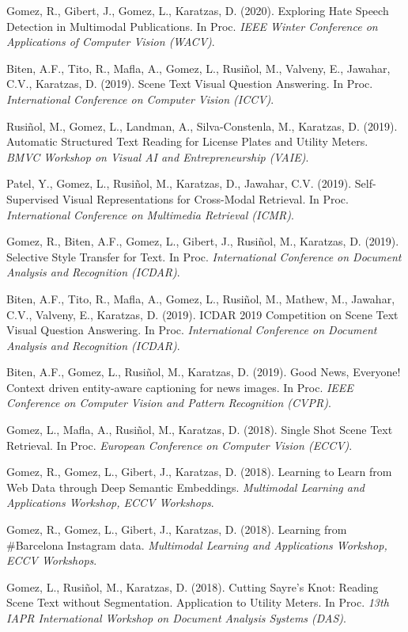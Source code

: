 \documentclass[11pt]{article}
\newcommand{\venue}[1]{\textit{#1}}
\begin{document}
\begin{pubs}
\item Gomez, R., Gibert, J., Gomez, L., Karatzas, D. (2020). Exploring Hate Speech Detection in Multimodal Publications. In Proc. \venue{IEEE Winter Conference on Applications of Computer Vision (WACV)}.
\item Biten, A.F., Tito, R., Mafla, A., Gomez, L., Rusiñol, M., Valveny, E., Jawahar, C.V., Karatzas, D. (2019). Scene Text Visual Question Answering. In Proc. \venue{International Conference on Computer Vision (ICCV)}.
\item Rusiñol, M., Gomez, L., Landman, A., Silva-Constenla, M., Karatzas, D. (2019). Automatic Structured Text Reading for License Plates and Utility Meters. \venue{BMVC Workshop on Visual AI and Entrepreneurship (VAIE)}.
\item Patel, Y., Gomez, L., Rusiñol, M., Karatzas, D., Jawahar, C.V. (2019). Self-Supervised Visual Representations for Cross-Modal Retrieval. In Proc. \venue{International Conference on Multimedia Retrieval (ICMR)}.
\item Gomez, R., Biten, A.F., Gomez, L., Gibert, J., Rusiñol, M., Karatzas, D. (2019). Selective Style Transfer for Text. In Proc. \venue{International Conference on Document Analysis and Recognition (ICDAR)}.
\item Biten, A.F., Tito, R., Mafla, A., Gomez, L., Rusiñol, M., Mathew, M., Jawahar, C.V., Valveny, E., Karatzas, D. (2019). ICDAR 2019 Competition on Scene Text Visual Question Answering. In Proc. \venue{International Conference on Document Analysis and Recognition (ICDAR)}.
\item Biten, A.F., Gomez, L., Rusiñol, M., Karatzas, D. (2019). Good News, Everyone! Context driven entity-aware captioning for news images. In Proc. \venue{IEEE Conference on Computer Vision and Pattern Recognition (CVPR)}.
\item Gomez, L., Mafla, A., Rusiñol, M., Karatzas, D. (2018). Single Shot Scene Text Retrieval. In Proc. \venue{European Conference on Computer Vision (ECCV)}.
\item Gomez, R., Gomez, L., Gibert, J., Karatzas, D. (2018). Learning to Learn from Web Data through Deep Semantic Embeddings. \venue{Multimodal Learning and Applications Workshop, ECCV Workshops}.
\item Gomez, R., Gomez, L., Gibert, J., Karatzas, D. (2018). Learning from \#Barcelona Instagram data. \venue{Multimodal Learning and Applications Workshop, ECCV Workshops}.
\item Gomez, L., Rusiñol, M., Karatzas, D. (2018). Cutting Sayre's Knot: Reading Scene Text without Segmentation. Application to Utility Meters. In Proc. \venue{13th IAPR International Workshop on Document Analysis Systems (DAS)}.

\end{pubs}
\end{document}

